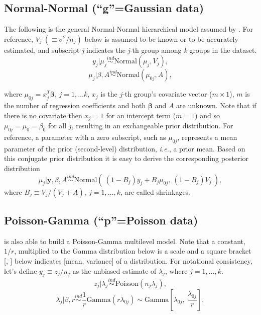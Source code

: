 \documentclass[article]{jss}
\begin{document}
\subsection[Normal-Normal]{Normal-Normal (``g''=Gaussian data)}
The following is the general Normal-Normal hierarchical model assumed by . For reference,  $V_{j}~(\equiv \sigma^{2}/n_{j})$ below is assumed to be known or to be accurately estimated, and subscript \emph{j} indicates the \emph{j}-th group among \emph{k} groups in the dataset.
\begin{equation}\label{normalobs}
y_{j}\vert \mu_{j} \stackrel{ind}{\sim}\textrm{Normal}(\mu_{j}, V_{j}),
\end{equation}
\begin{equation}\label{normalprior}
\mu_{j}\vert \beta, A\stackrel{ind}{\sim}\textrm{Normal}(\mu_{0j}, A),
\end{equation}

where $\mu_{0j} = x^{T}_{j} \mathbf{\beta}$, $j=1, \ldots k$, $x_{j}$ is the $j$-th group's covariate vector ($m\times 1$), $m$ is the number of regression coefficients and both $\mathbf{\beta}$ and $A$ are unknown. Note that if there is no covariate then $x_{j}=1$ for an intercept term ($m=1$) and so $\mu_{0j}=\mu_{0}=\beta_{0}$ for all $j$, resulting in an exchangeable prior distribution. For reference, a parameter with a zero subscript, such as $\mu_{0j}$, represents a mean parameter of the prior (second-level) distribution, \emph{i.e.}, a prior mean. Based on this conjugate prior distribution it is easy to derive the corresponding posterior distribution
\begin{equation} \label{normalpost}
\mu_{j}\vert \textbf{y}, \beta, A \stackrel{ind}{\sim}\textrm{Normal}(~(1-B_{j})y_{j} + B_{j}\mu_{0j},~(1-B_{j})V_{j}~),
\end{equation}
where $B_{j}\equiv V_{j}/(V_{j} + A),~j=1, \ldots, k$, are called shrinkages.

\subsection[Poisson-Gamma]{Poisson-Gamma (``p''=Poisson data)}
 is also able to build a Poisson-Gamma multilevel model. Note that a constant, $1/r$, multiplied to the Gamma distribution below is a scale and a square bracket [, ] below indicates [mean, variance] of a distribution. For notational consistency, let's define $y_{j}\equiv z_{j} / n_{j}$ as the unbiased estimate of $\lambda_{j}$, where $j=1, \ldots, k$.
\begin{equation}
z_{j}\vert \lambda_{j} \stackrel{ind}{\sim}\textrm{Poisson}(n_{j}\lambda_{j}),
\end{equation}
\begin{equation}\label{gammaprior}
\lambda_{j}\vert \beta, r\stackrel{ind}{\sim}\frac{1}{r}\textrm{Gamma}(r\lambda_{0j})\sim \textrm{Gamma} \left[\lambda_{0j}, ~\frac{\lambda_{0j}}{r} \right],
\end{equation}
\end{document}
